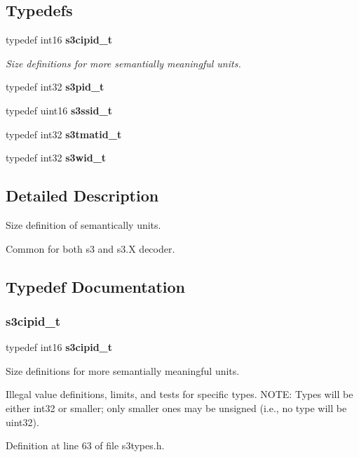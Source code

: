 \subsection*{Typedefs}
\begin{DoxyCompactItemize}
\item 
typedef int16 \textbf{ s3cipid\+\_\+t}
\begin{DoxyCompactList}\small\item\em Size definitions for more semantially meaningful units. \end{DoxyCompactList}\item 
\mbox{\label{s3types_8h_ace0794ef7ba6d215e2688832216771b8}} 
typedef int32 {\bfseries s3pid\+\_\+t}
\item 
\mbox{\label{s3types_8h_afa911acbebf09269bbc7b6821aee9c1d}} 
typedef uint16 {\bfseries s3ssid\+\_\+t}
\item 
\mbox{\label{s3types_8h_a6a7df1b2c1909fbe51979dac693549c0}} 
typedef int32 {\bfseries s3tmatid\+\_\+t}
\item 
\mbox{\label{s3types_8h_a1d7fc272539abdf946c1074f9ec9a71c}} 
typedef int32 {\bfseries s3wid\+\_\+t}
\end{DoxyCompactItemize}


\subsection{Detailed Description}
Size definition of semantically units. 

Common for both s3 and s3.\+X decoder. 

\subsection{Typedef Documentation}
\mbox{\label{s3types_8h_ae5f70241ce62a79747f0611029a6409d}} 
\subsubsection{s3cipid\+\_\+t}
{\footnotesize\ttfamily typedef int16 \textbf{ s3cipid\+\_\+t}}



Size definitions for more semantially meaningful units. 

Illegal value definitions, limits, and tests for specific types. N\+O\+TE\+: Types will be either int32 or smaller; only smaller ones may be unsigned (i.\+e., no type will be uint32). 

Definition at line 63 of file s3types.\+h.

